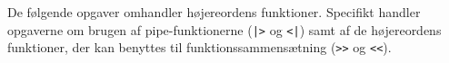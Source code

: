 De følgende opgaver omhandler højereordens funktioner. Specifikt
handler opgaverne om brugen af pipe-funktionerne (\lstinline{|>}
og \lstinline{<|}) samt af de højereordens funktioner, der kan
benyttes til funktionssammensætning (\lstinline{>>} og \lstinline{<<}).
